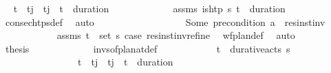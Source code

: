 \begin{isabellebody}
\ \isamarkupfalse%
\ {\isachardoublequoteopen}t\isactrlsub {\isasympi}\ {\isacharless}{\kern0pt}\ t\isactrlsub j\ {\isasymand}\ t\isactrlsub j\ {\isasymle}\ t\isactrlsub {\isasympi}\ {\isacharplus}{\kern0pt}\ {\isacharparenleft}{\kern0pt}duration\ {\isasympi}{\isacharparenright}{\kern0pt}{\isachardoublequoteclose}\isanewline
\ \ \ \ \ \ \ \ \ \ \isamarkupfalse%
\ assms\ {\isacartoucheopen}is{\isacharunderscore}{\kern0pt}htp\ {\isasympi}s\ {\isacharparenleft}{\kern0pt}t\isactrlsub {\isasympi}\ {\isacharplus}{\kern0pt}\ duration\ {\isasympi}{\isacharparenright}{\kern0pt}{\isacartoucheclose}\ \isamarkupfalse%
\ consec{\isacharunderscore}{\kern0pt}htps{\isacharunderscore}{\kern0pt}def\ \isamarkupfalse%
\ auto\isanewline
\ \ \ \ \ \ \ \ \isanewline
\ \ \ \ \ \ \ \ \isamarkupfalse%
\ {\isachardoublequoteopen}Some\ {\isacharparenleft}{\kern0pt}precondition\ a{\isacharparenright}{\kern0pt}\ {\isacharequal}{\kern0pt}\ res{\isacharunderscore}{\kern0pt}inst{\isacharunderscore}{\kern0pt}inv\ {\isasympi}{\isachardoublequoteclose}\isanewline
\ \ \ \ \ \ \ \ \ \ \isamarkupfalse%
\ assms\ {\isacartoucheopen}{\isacharparenleft}{\kern0pt}t\isactrlsub {\isasympi}{\isacharcomma}{\kern0pt}{\isasympi}{\isacharparenright}{\kern0pt}\ {\isasymin}\ set\ {\isasympi}s{\isacartoucheclose}\ {\isacartoucheopen}{\isacharquery}{\kern0pt}case{}{\isacartoucheclose}\ res{\isacharunderscore}{\kern0pt}inst{\isacharunderscore}{\kern0pt}inv{\isacharunderscore}{\kern0pt}refine\ \isamarkupfalse%
\ wf{\isacharunderscore}{\kern0pt}plan{\isacharunderscore}{\kern0pt}def\ \isamarkupfalse%
\ auto\isanewline
\isanewline
\ \ \ \ \ \ \ \ \isamarkupfalse%
\ \isamarkupfalse%
\ {\isacharquery}{\kern0pt}thesis\ \isanewline
\ \ \ \ \ \ \ \ \ \ \isamarkupfalse%
\ invs{\isacharunderscore}{\kern0pt}of{\isacharunderscore}{\kern0pt}plan{\isacharunderscore}{\kern0pt}at{\isacharunderscore}{\kern0pt}def\isanewline
\ \ \ \ \ \ \ \ \ \ \isamarkupfalse%
\ {\isacartoucheopen}{\isacharparenleft}{\kern0pt}t\isactrlsub {\isasympi}{\isacharcomma}{\kern0pt}{\isasympi}{\isacharparenright}{\kern0pt}\ {\isasymin}\ durative{\isacharunderscore}{\kern0pt}acts\ {\isasympi}s{\isacartoucheclose}\ \isanewline
\ \ \ \ \ \ \ \ \ \ \ \ \ \ \ \ {\isacartoucheopen}t\isactrlsub {\isasympi}\ {\isacharless}{\kern0pt}\ t\isactrlsub j\ {\isasymand}\ t\isactrlsub j\ {\isasymle}\ t\isactrlsub {\isasympi}\ {\isacharplus}{\kern0pt}\ {\isacharparenleft}{\kern0pt}duration\ {\isasympi}{\isacharparenright}{\kern0pt}{\isacartoucheclose}\ \isanewline

\end{isabellebody}
